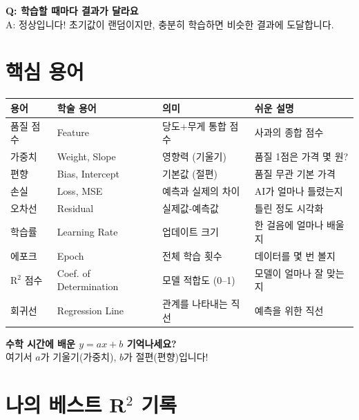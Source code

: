 \documentclass[11pt, a4paper]{article}
\begin{document}
\vspace{0.3cm}

\textbf{Q: 학습할 때마다 결과가 달라요}\\
A: 정상입니다! 초기값이 랜덤이지만, 충분히 학습하면 비슷한 결과에 도달합니다.

\section{핵심 용어}

\begin{center}
\small
\begin{tabular}{llp{4cm}p{4cm}}
    \toprule
    \textbf{용어} & \textbf{학술 용어} & \textbf{의미} & \textbf{쉬운 설명} \\
    \midrule
    품질 점수 & Feature & 당도+무게 통합 점수 & 사과의 종합 점수 \\
    가중치 & Weight, Slope & 영향력 (기울기) & 품질 1점은 가격 몇 원? \\
    편향 & Bias, Intercept & 기본값 (절편) & 품질 무관 기본 가격 \\
    손실 & Loss, MSE & 예측과 실제의 차이 & AI가 얼마나 틀렸는지 \\
    오차선 & Residual & 실제값-예측값 & 틀린 정도 시각화 \\
    학습률 & Learning Rate & 업데이트 크기 & 한 걸음에 얼마나 배울지 \\
    에포크 & Epoch & 전체 학습 횟수 & 데이터를 몇 번 볼지 \\
    R$^2$ 점수 & Coef. of Determination & 모델 적합도 (0--1) & 모델이 얼마나 잘 맞는지 \\
    회귀선 & Regression Line & 관계를 나타내는 직선 & 예측을 위한 직선 \\
    \bottomrule
\end{tabular}
\end{center}

\vspace{0.5cm}

\begin{tipbox}
\textbf{수학 시간에 배운 $y = ax + b$ 기억나세요?}\\
여기서 $a$가 기울기(가중치), $b$가 절편(편향)입니다!
\end{tipbox}

\section{나의 베스트 R$^2$ 기록}
\end{document}
